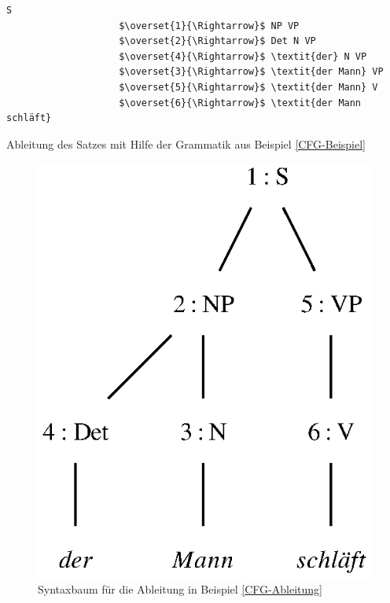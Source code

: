 \begin{program}[h!tp]
\begin{Verbatim}[commandchars=\\\{\},codes={\catcode`$=3\catcode`^=7}] 
                    S
                    $\overset{1}{\Rightarrow}$ NP VP
                    $\overset{2}{\Rightarrow}$ Det N VP
                    $\overset{4}{\Rightarrow}$ \textit{der} N VP
                    $\overset{3}{\Rightarrow}$ \textit{der Mann} VP
                    $\overset{5}{\Rightarrow}$ \textit{der Mann} V
                    $\overset{6}{\Rightarrow}$ \textit{der Mann schläft}
\end{Verbatim}
\caption{Ableitung des Satzes mit Hilfe der Grammatik aus Beispiel \ref{CFG-Beispiel}}
\label{CFG-Ableitung}
\end{program}
\begin{figure}[h!tp]
\includegraphics{graphics/MiniSatzSyntax.eps}
\caption{Syntaxbaum für die Ableitung in Beispiel \ref{CFG-Ableitung}}
\label{CFG-Syntaxbaum}
\end{figure}
